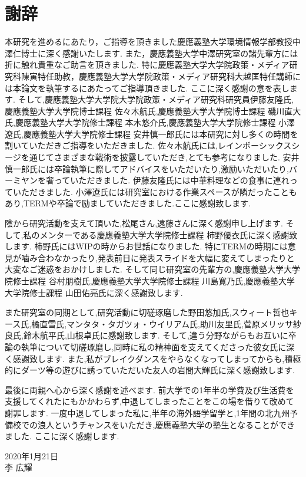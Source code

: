 \chapter*{謝辞}
本研究を進めるにあたり，ご指導を頂きました慶應義塾大学環境情報学部教授中澤仁博士に深く感謝いたします.
また，慶應義塾大学中澤研究室の諸先輩方には折に触れ貴重なご助言を頂きました.
特に慶應義塾大学大学院政策・メディア研究科陳寅特任助教，慶應義塾大学大学院政策・メディア研究科大越匡特任講師には本論文を執筆するにあたってご指導頂きました.
ここに深く感謝の意を表します.
そして,慶應義塾大学大学院大学院政策・メディア研究科研究員伊藤友隆氏,慶應義塾大学大学院博士課程 佐々木航氏,慶應義塾大学大学院博士課程 磯川直大氏,慶應義塾大学大学院修士課程 本木悠介氏,慶應義塾大学大学院修士課程 小澤遼氏,慶應義塾大学大学院修士課程 安井慎一郎氏には本研究に対し多くの時間を割いていただきご指導をいただきました.
佐々木航氏には,レインボーシックスシージを通じてさまざまな戦術を披露していただき,とても参考になりました.
安井慎一郎氏には卒論執筆に際してアドバイスをいただいたり,激励いただいたり,バーミヤンを奢っていただきました.
伊藤友隆氏には中華料理などの食事に連れっていただきました.
小澤遼氏には研究室における作業スペースが隣だったこともあり,TERMや卒論で励ましていただきました.ここに感謝致します.

陰から研究活動を支えて頂いた,松尾さん,遠藤さんに深く感謝申し上げます.
そして,私のメンターである慶應義塾大学大学院修士課程 柿野優衣氏に深く感謝致します.
柿野氏にはWIPの時からお世話になりました.
特にTERMの時期には意見が噛み合わなかったり,発表前日に発表スライドを大幅に変えてしまったりと大変なご迷惑をおかけしました.
そして同じ研究室の先輩方の,慶應義塾大学大学院修士課程 谷村朋樹氏,慶應義塾大学大学院修士課程 川島寛乃氏,慶應義塾大学大学院修士課程 山田佑亮氏に深く感謝致します.

また研究室の同期として,研究活動に切磋琢磨した野田悠加氏,スウィート哲也キース氏,橘直雪氏,マンタタ・タガツォ・ウイリアム氏,助川友里氏,菅原メリッサ紗良氏,鈴木航平氏,山根卓氏に感謝致します.
そして,違う分野ながらもお互いに卒論の執筆について切磋琢磨し,同時に私の精神面を支えてくださった彼女氏に深く感謝致します.
また,私がブレイクダンスをやらなくなってしまってからも,積極的にダーツ等の遊びに誘っていただいた友人の岩間大輝氏に深く感謝致します.

最後に両親へ心から深く感謝を述べます.
前大学での1年半の学費及び生活費を支援してくれたにもかかわらず,中退してしまったことをこの場を借りて改めて謝罪します.
一度中退してしまった私に,半年の海外語学留学と,1年間の北九州予備校での浪人というチャンスをいただき,慶應義塾大学の塾生となることができました.
ここに深く感謝します.

\begin{flushright}
2020年1月21日\\
李 広耀
\end{flushright}
